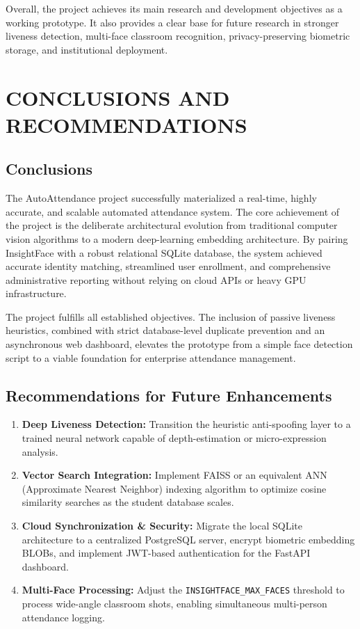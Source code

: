 \documentclass[12pt,a4paper]{report}
\newcommand{\JustifiedNormal}{\fontsize{12}{14}\selectfont\justifying\setlength{\parindent}{0pt}}
\begin{document}
Overall, the project achieves its main research and development objectives as a working prototype. It also provides a clear base for future research in stronger liveness detection, multi-face classroom recognition, privacy-preserving biometric storage, and institutional deployment.

\chapter{CONCLUSIONS AND RECOMMENDATIONS}

\section{Conclusions}
\JustifiedNormal
The AutoAttendance project successfully materialized a real-time, highly accurate, and scalable automated attendance system. The core achievement of the project is the deliberate architectural evolution from traditional computer vision algorithms to a modern deep-learning embedding architecture. By pairing InsightFace with a robust relational SQLite database, the system achieved accurate identity matching, streamlined user enrollment, and comprehensive administrative reporting without relying on cloud APIs or heavy GPU infrastructure.

The project fulfills all established objectives. The inclusion of passive liveness heuristics, combined with strict database-level duplicate prevention and an asynchronous web dashboard, elevates the prototype from a simple face detection script to a viable foundation for enterprise attendance management.

\section{Recommendations for Future Enhancements}
\JustifiedNormal
\begin{enumerate}[leftmargin=*]
  \item \textbf{Deep Liveness Detection:} Transition the heuristic anti-spoofing layer to a trained neural network capable of depth-estimation or micro-expression analysis.
  \item \textbf{Vector Search Integration:} Implement FAISS or an equivalent ANN (Approximate Nearest Neighbor) indexing algorithm to optimize cosine similarity searches as the student database scales.
  \item \textbf{Cloud Synchronization \& Security:} Migrate the local SQLite architecture to a centralized PostgreSQL server, encrypt biometric embedding BLOBs, and implement JWT-based authentication for the FastAPI dashboard.
  \item \textbf{Multi-Face Processing:} Adjust the \texttt{INSIGHTFACE\_MAX\_FACES} threshold to process wide-angle classroom shots, enabling simultaneous multi-person attendance logging.
\end{enumerate}
\end{document}
